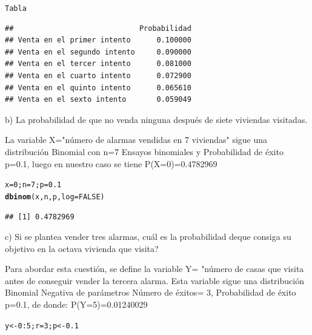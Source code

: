 \documentclass[12pt,letterpaper]{article}\usepackage[]{graphicx}\usepackage[]{color}
\makeatletter
\newcommand{\hlnum}[1]{\textcolor[rgb]{0.686,0.059,0.569}{#1}}%
\newcommand{\hlopt}[1]{\textcolor[rgb]{0,0,0}{#1}}%
\newcommand{\hlstd}[1]{\textcolor[rgb]{0.345,0.345,0.345}{#1}}%
\newcommand{\hlkwb}[1]{\textcolor[rgb]{0.69,0.353,0.396}{#1}}%
\newcommand{\hlkwc}[1]{\textcolor[rgb]{0.333,0.667,0.333}{#1}}%
\newcommand{\hlkwd}[1]{\textcolor[rgb]{0.737,0.353,0.396}{\textbf{#1}}}%
\newenvironment{kframe}{%
 \def\at@end@of@kframe{}%
 \ifinner\ifhmode%
  \def\at@end@of@kframe{\end{minipage}}%
  \begin{minipage}{\columnwidth}%
 \fi\fi%
 \def\FrameCommand##1{\hskip\@totalleftmargin \hskip-\fboxsep
 \colorbox{shadecolor}{##1}\hskip-\fboxsep
     \hskip-\linewidth \hskip-\@totalleftmargin \hskip\columnwidth}%
 \MakeFramed {\advance\hsize-\width
   \@totalleftmargin\z@ \linewidth\hsize
   \@setminipage}}%
 {\par\unskip\endMakeFramed%
 \at@end@of@kframe}
\newenvironment{knitrout}{}{} %
\makeatother
\begin{document}
\begin{itemize}
\begin{knitrout}
\begin{kframe}
\begin{alltt}
\hlstd{Tabla}
\end{alltt}
\begin{verbatim}
##                             Probabilidad
## Venta en el primer intento      0.100000
## Venta en el segundo intento     0.090000
## Venta en el tercer intento      0.081000
## Venta en el cuarto intento      0.072900
## Venta en el quinto intento      0.065610
## Venta en el sexto intento       0.059049
\end{verbatim}
\end{kframe}
\end{knitrout}
\begin{description}
  \item b) La probabilidad de que no venda ninguna despu\'es de siete viviendas visitadas. 
\end{description}
La variable X="n\'umero de alarmas vendidas en 7 viviendas" sigue una distribuci\'on Binomial con n=7 Ensayos binomiales y Probabilidad de \'exito p=0.1, luego en nuestro caso se tiene P(X=0)=0.4782969
\begin{knitrout}
\color{fgcolor}\begin{kframe}
\begin{alltt}
\hlstd{x}\hlkwb{=}\hlnum{0}\hlstd{; n}\hlkwb{=}\hlnum{7}\hlstd{; p}\hlkwb{=}\hlnum{0.1}
\hlkwd{dbinom}\hlstd{(x, n, p,} \hlkwc{log} \hlstd{=} \hlnum{FALSE}\hlstd{)}
\end{alltt}
\begin{verbatim}
## [1] 0.4782969
\end{verbatim}
\end{kframe}
\end{knitrout}
\begin{description}
  \item c) Si se plantea vender tres alarmas, \¿cu\'al es la probabilidad deque consiga su objetivo en la octava vivienda que visita?  
\end{description}
Para abordar esta cuesti\'on, se define la variable Y= "n\'umero de casas que visita antes de conseguir vender la tercera alarma. Esta variable sigue una distribuci\'on Binomial Negativa de par\'ametros N\'umero de \'exitos= 3, Probabilidad de \'exito p=0.1, de donde: P(Y=5)=0.01240029
\begin{knitrout}
\color{fgcolor}\begin{kframe}
\begin{alltt}
\hlstd{y} \hlkwb{<-} \hlnum{0}\hlopt{:}\hlnum{5}\hlstd{; r}\hlkwb{=}\hlnum{3}\hlstd{; p} \hlkwb{<-} \hlnum{0.1}


\end{alltt}
\end{kframe}
\end{knitrout}
\end{itemize}
\end{document}
